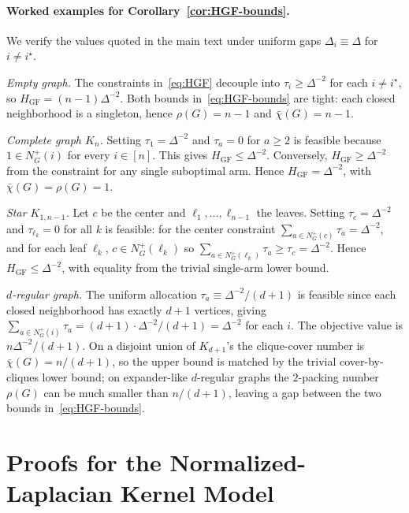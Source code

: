 \documentclass{article}
\begin{document}
\paragraph{Worked examples for Corollary~\ref{cor:HGF-bounds}.}
We verify the values quoted in the main text under uniform gaps $\Delta_i\equiv\Delta$ for $i\neq i^\star$.

\emph{Empty graph.} The constraints in~\eqref{eq:HGF} decouple into $\tau_i\ge\Delta^{-2}$ for each $i\neq i^\star$, so $H_{\mathrm{GF}}=(n-1)\Delta^{-2}$. Both bounds in~\eqref{eq:HGF-bounds} are tight: each closed neighborhood is a singleton, hence $\rho(G)=n-1$ and $\bar\chi(G)=n-1$.

\emph{Complete graph $K_n$.} Setting $\tau_1=\Delta^{-2}$ and $\tau_a=0$ for $a\ge 2$ is feasible because $1\in N_G^+(i)$ for every $i\in[n]$. This gives $H_{\mathrm{GF}}\le\Delta^{-2}$. Conversely, $H_{\mathrm{GF}}\ge\Delta^{-2}$ from the constraint for any single suboptimal arm. Hence $H_{\mathrm{GF}}=\Delta^{-2}$, with $\bar\chi(G)=\rho(G)=1$.

\emph{Star $K_{1,n-1}$.} Let $c$ be the center and $\ell_1,\dots,\ell_{n-1}$ the leaves. Setting $\tau_c=\Delta^{-2}$ and $\tau_{\ell_k}=0$ for all $k$ is feasible: for the center constraint $\sum_{a\in N_G^+(c)}\tau_a=\Delta^{-2}$, and for each leaf $\ell_k$, $c\in N_G^+(\ell_k)$ so $\sum_{a\in N_G^+(\ell_k)}\tau_a\ge\tau_c=\Delta^{-2}$. Hence $H_{\mathrm{GF}}\le\Delta^{-2}$, with equality from the trivial single-arm lower bound.

\emph{$d$-regular graph.} The uniform allocation $\tau_a\equiv\Delta^{-2}/(d+1)$ is feasible since each closed neighborhood has exactly $d+1$ vertices, giving $\sum_{a\in N_G^+(i)}\tau_a=(d+1)\cdot\Delta^{-2}/(d+1)=\Delta^{-2}$ for each $i$. The objective value is $n\Delta^{-2}/(d+1)$. On a disjoint union of $K_{d+1}$'s the clique-cover number is $\bar\chi(G)=n/(d+1)$, so the upper bound is matched by the trivial cover-by-cliques lower bound; on expander-like $d$-regular graphs the $2$-packing number $\rho(G)$ can be much smaller than $n/(d+1)$, leaving a gap between the two bounds in~\eqref{eq:HGF-bounds}.


\section{Proofs for the Normalized-Laplacian Kernel Model}
\label{app:proofs-normalized}
\end{document}
